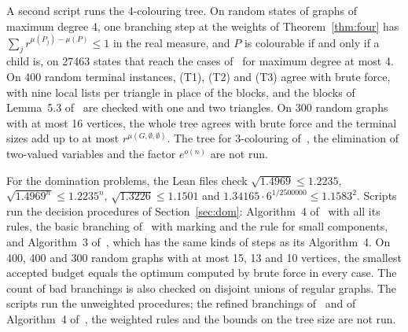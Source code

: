 \documentclass[11pt]{article}
\theoremstyle{remark}
\begin{document}
A second script runs the 4-colouring tree. On random states of graphs of maximum degree 4, one branching step at the weights of Theorem~\ref{thm:four} has $\sum_j r^{\mu(P_j) - \mu(P)} \le 1$ in the real measure, and $P$ is colourable if and only if a child is, on 27463 states that reach the cases of~\cite{WGJ24} for maximum degree at most 4. On 400 random terminal instances, (T1), (T2) and (T3) agree with brute force, with nine local lists per triangle in place of the blocks, and the blocks of Lemma~5.3 of~\cite{YS26} are checked with one and two triangles. On 300 random graphs with at most 16 vertices, the whole tree agrees with brute force and the terminal sizes add up to at most $r^{\mu(G,\emptyset,\emptyset)}$. The tree for 3-colouring of~\cite{BE05}, the elimination of two-valued variables and the factor $e^{o(n)}$ are not run.

For the domination problems, the Lean files check $\sqrt{1.4969} \le 1.2235$, $\sqrt{1.4969^n} \le 1.2235^n$, $\sqrt{1.3226} \le 1.1501$ and $1.34165 \cdot 6^{1/2500000} \le 1.1583^2$. Scripts run the decision procedures of Section~\ref{sec:dom}: Algorithm~4 of~\cite{RB11} with all its rules, the basic branching of~\cite{BEP10} with marking and the rule for small components, and Algorithm~3 of~\cite{RB12}, which has the same kinds of steps as its Algorithm~4. On 400, 400 and 300 random graphs with at most 15, 13 and 10 vertices, the smallest accepted budget equals the optimum computed by brute force in every case. The count of bad branchings is also checked on disjoint unions of regular graphs. The scripts run the unweighted procedures; the refined branchings of~\cite{BEP10} and of Algorithm~4 of~\cite{RB12}, the weighted rules and the bounds on the tree size are not run.
\end{document}
